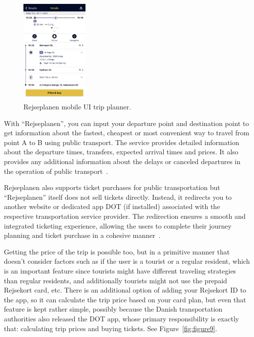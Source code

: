 \begin{figure}
    \begin{center}
        \includegraphics[width=0.3\textwidth]{images/rejseplanen-trip}
    \end{center}
    \caption{Rejseplanen mobile UI trip planner.}
    \label{fig:figure8}
\end{figure}

With ``Rejseplanen'', you can input your departure point and destination point to get information about the fastest,
cheapest or most convenient way to travel from point A to B using public transport.
The service provides detailed information about the departure times, transfers, expected arrival times and prices.
It also provides any additional information about the delays or canceled departures in the operation of public
transport~\cite{rejseplanen2023}.

Rejseplanen also supports ticket purchases for public transportation but ``Rejseplanen'' itself does not sell tickets
directly.
Instead, it redirects you to another website or dedicated app DOT (if installed) associated with the respective
transportation service provider.
The redirection ensures a smooth and integrated ticketing experience, allowing the users to complete their journey
planning and ticket purchase in a cohesive manner~\cite{rejseplanen2023}.

Getting the price of the trip is possible too, but in a primitive manner that doesn't consider factors such as if the
user is a tourist or a regular resident, which is an important feature since tourists might have different traveling
strategies than regular residents, and additionally tourists might not use the prepaid Rejsekort card, etc.
There is an additional option of adding your Rejsekort ID to the app, so it can calculate the trip price based on your
card plan, but even that feature is kept rather simple, possibly because the Danish transportation authorities also
released the DOT app, whose primary responsibility is exactly that: calculating trip prices and buying tickets.
See Figure~\ref{fig:figure9}.

